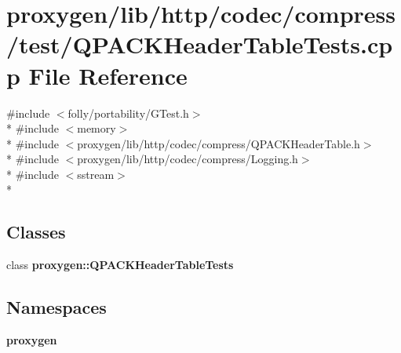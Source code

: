 \section{proxygen/lib/http/codec/compress/test/\+Q\+P\+A\+C\+K\+Header\+Table\+Tests.cpp File Reference}
\label{QPACKHeaderTableTests_8cpp}
{\ttfamily \#include $<$folly/portability/\+G\+Test.\+h$>$}\\*
{\ttfamily \#include $<$memory$>$}\\*
{\ttfamily \#include $<$proxygen/lib/http/codec/compress/\+Q\+P\+A\+C\+K\+Header\+Table.\+h$>$}\\*
{\ttfamily \#include $<$proxygen/lib/http/codec/compress/\+Logging.\+h$>$}\\*
{\ttfamily \#include $<$sstream$>$}\\*
\subsection*{Classes}
\begin{DoxyCompactItemize}
\item 
class {\bf proxygen\+::\+Q\+P\+A\+C\+K\+Header\+Table\+Tests}
\end{DoxyCompactItemize}
\subsection*{Namespaces}
\begin{DoxyCompactItemize}
\item 
 {\bf proxygen}
\end{DoxyCompactItemize}
